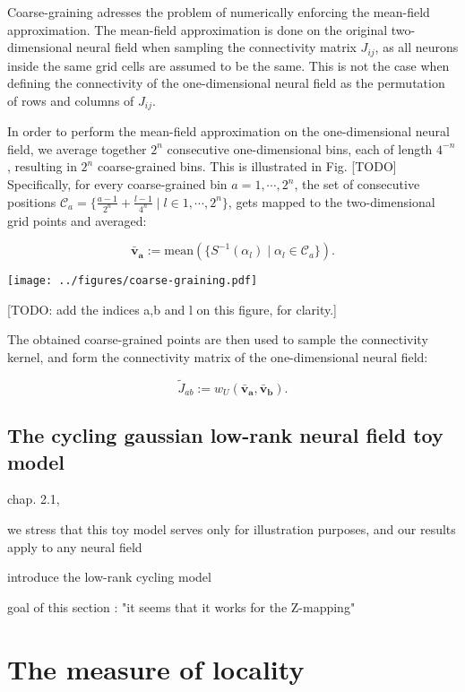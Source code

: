 \documentclass[10pt,letterpaper]{article}
\renewcommand{\vec}[1]{\boldsymbol{#1}}
\begin{document}
Coarse-graining adresses the problem of numerically enforcing the mean-field approximation. The mean-field approximation is done on the original two-dimensional neural field when sampling the connectivity matrix $J_{ij}$, as all neurons inside the same grid cells are assumed to be the same. This is not the case when defining the connectivity of the one-dimensional neural field as the permutation of rows and columns of $J_{ij}$.

In order to perform the mean-field approximation on the one-dimensional neural field, we average together $2^n$ consecutive one-dimensional bins, each of length $4^{-n}$, resulting in $2^n$ coarse-grained bins. This is illustrated in Fig. [TODO] Specifically, for every coarse-grained bin $a=1,\cdots,2^n$, the set of consecutive positions $\mathcal{C}_a = \{\tfrac{a-1}{2^n} + \tfrac{l-1}{4^n} \;|\; l \in 1, \cdots, 2^n\}$, gets mapped to the two-dimensional grid points and averaged:

\begin{equation*}
\vec{\bar v_a} := \textrm{mean}(\{S^{-1}(\alpha_l) \;|\; \alpha_l \in \mathcal{C}_a\}).
\end{equation*}

\texttt{[image: ../figures/coarse-graining.pdf]}

[TODO: add the indices a,b and l on this figure, for clarity.]
\endif

The obtained coarse-grained points are then used to sample the connectivity kernel, and form the connectivity matrix of the one-dimensional neural field:

\begin{equation}
\tilde J_{ab} := w_U(\vec{\bar v_a}, \vec{\bar v_b}).
\end{equation}

\subsection{The cycling gaussian low-rank neural field toy model}

chap. 2.1, 

we stress that this toy model serves only for illustration purposes, and our results apply to any neural field

introduce the low-rank cycling model

goal of this section : "it seems that it works for the Z-mapping"

\section{The measure of locality}
\end{document}
